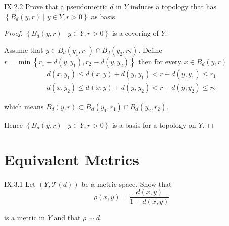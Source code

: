 \begin{problem}{IX.2.2}
Prove that a pseudometric \( d \) in \( Y \) induces a topology that has \( \left\{ B_{d}(y, r) \mid y \in Y, r > 0 \right\} \) as basis.
\end{problem}

\begin{proof}
	\( \left\{ B_{d}(y, r) \mid y \in Y, r > 0 \right\} \) is a covering of \( Y \).

	Assume that \( y \in B_{d}(y_{1}, r_{1}) \cap B_{d}(y_{2}, r_{2}) \). Define \( r = \min\left\{ r_{1} - d(y, y_{1}), r_{2} - d(y, y_{2}) \right\} \) then for every \( x \in B_{d}(y, r) \)
	\[
		\begin{split}
			d(x, y_{1}) \le d(x, y) + d(y, y_{1}) < r + d(y, y_{1}) \le r_{1} \\
			d(x, y_{2}) \le d(x, y) + d(y, y_{2}) < r + d(y, y_{2}) \le r_{2}
		\end{split}
	\]

	which means \( B_{d}(y, r) \subset B_{d}(y_{1}, r_{1}) \cap B_{d}(y_{2}, r_{2}) \).

	Hence \( \left\{ B_{d}(y, r) \mid y \in Y, r > 0 \right\} \) is a basis for a topology on \( Y \).
\end{proof}

\section{Equivalent Metrics}

\begin{problem}{IX.3.1}
Let \( (Y, \mathscr{T}(d)) \) be a metric space. Show that
\[
	\rho(x, y) = \dfrac{d(x, y)}{1 + d(x, y)}
\]

is a metric in \( Y \) and that \( \rho \sim d \).
\end{problem}

